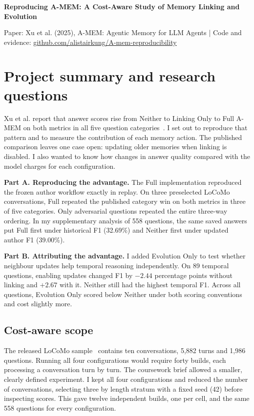 \documentclass[11pt,a4paper]{article}
\begin{document}
{\centering\LARGE\bfseries Reproducing A-MEM: A Cost-Aware Study of Memory Linking and Evolution\par}
\vspace{5pt}{\centering\small FTEC5660 — Agentic AI for Business and FinTech  |  Individual Reproducibility Assignment\par}
{\centering\small Paper: Xu et al. (2025), A-MEM: Agentic Memory for LLM Agents  |  Code and evidence: \href{https://github.com/alistairkung/A-mem-reproducibility}{github.com/alistairkung/A-mem-reproducibility}\par}\vspace{8pt}
\par
\section{Project summary and research questions}
Xu et al. report that answer scores rise from Neither to Linking Only to Full A-MEM on both metrics in all five question categories~\cite{xu2025amem}. I set out to reproduce that pattern and to measure the contribution of each memory action. The published comparison leaves one case open: updating older memories when linking is disabled. I also wanted to know how changes in answer quality compared with the model charges for each configuration.

\textbf{Part A. Reproducing the advantage.} The Full implementation reproduced the frozen author workflow exactly in replay. On three preselected LoCoMo conversations, Full repeated the published category win on both metrics in three of five categories. Only adversarial questions repeated the entire three-way ordering. In my supplementary analysis of 558 questions, the same saved answers put Full first under historical F1 (32.69\%) and Neither first under updated author F1 (39.00\%).

\textbf{Part B. Attributing the advantage.} I added Evolution Only to test whether neighbour updates help temporal reasoning independently. On 89 temporal questions, enabling updates changed F1 by $-2.44$ percentage points without linking and $+2.67$ with it. Neither still had the highest temporal F1. Across all questions, Evolution Only scored below Neither under both scoring conventions and cost slightly more.

\subsection{Cost-aware scope}
The released LoCoMo sample~\cite{locomo} contains ten conversations, 5,882 turns and 1,986 questions. Running all four configurations would require forty builds, each processing a conversation turn by turn. The coursework brief allowed a smaller, clearly defined experiment. I kept all four configurations and reduced the number of conversations, selecting three by length stratum with a fixed seed (42) before inspecting scores. This gave twelve independent builds, one per cell, and the same 558 questions for every configuration.
\end{document}
